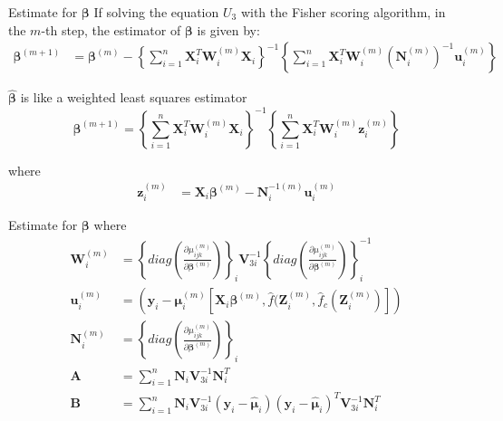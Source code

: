 \documentclass[t,9pt]{beamer}
\begin{document}
\begin{frame}[fragile]{Estimate for $\pmb{\beta}$}
If solving the equation $U_3$ with the Fisher scoring algorithm, in the  $m$-th step, the estimator of $\pmb{\beta}$ is given by:
\begin{align}
 \pmb{\beta}^{(m+1)}&=\pmb{\beta}^{(m)}- \left\{ \sum_{i=1}^n \pmb{X}_i^T \pmb{W}_i^{(m)} \pmb{X}_i \right\}^{-1} \left\{\sum_{i=1}^n\pmb{X}_i^T \pmb{W}_i^{(m)} \left(\pmb{N}_i^{(m)} \right)^{-1}  \pmb{u}_i^{(m)}  \right\} \nonumber
 \end{align}
\begin{block}{$\hat{\pmb{\beta}}$ is like a weighted least squares estimator}
   \begin{equation}\nonumber
    \pmb{\beta}^{(m+1)}=\left\{ \sum_{i=1}^n \pmb{X}_i^T \pmb{W}_i^{(m)} \pmb{X}_i \right\}^{-1} \left\{\sum_{i=1}^n\pmb{X}_i^T \pmb{W}_i^{(m)}  \pmb{z}_i^{(m)}  \right\} 
\end{equation}
\end{block}
where
 \begin{align*}
     \pmb{z}^{(m)}_i&=\pmb{X}_i\pmb{\beta}^{(m)}-\pmb{N}_i^{-1(m)}\pmb{u}_i^{(m)} 
\end{align*}
\end{frame}
\begin{frame}[fragile]{Estimate for $\pmb{\beta}$}
where
\begin{align*}
\pmb{W}_i^{(m)}&=\left\{  diag\left(\frac{\partial \mu_{ijk}^{(m)}}{\partial \pmb{\beta}^{(m)}}\right)\right\}_i\pmb{V}^{-1}_{3i} \left\{  diag\left(\frac{\partial \mu_{ijk}^{(m)}}{\partial \pmb{\beta}^{(m)}}\right)\right\}_i ^{-1} \\
\pmb{u}_i^{(m)}&=\left(\pmb{y}_i-\pmb{\mu}_i^{(m)}\left[\pmb{X}_i \pmb{\beta}^{(m)},\hat{f}(\pmb{Z}_{i}^{(m)} ,\hat{f}_c(\pmb{Z}_{i}^{(m)}) \right]\right)\\
\pmb{N}_i^{(m)}&=\left\{  diag\left(\frac{\partial \mu_{ijk}^{(m)}}{\partial \pmb{\beta}^{(m)}}\right)\right\}_i\\
 \pmb{A}&=\sum_{i=1}^n  \pmb{N}_i \pmb{V}^{-1}_{3i}\pmb{N}_i^T \\
   \pmb{B}&=\sum_{i=1}^n  \pmb{N}_i \pmb{V}^{-1}_{3i}\left(\pmb{y}_i-\pmb{\hat{\mu}}_i\right)\left(\pmb{y}_i-\pmb{\hat{\mu}}_i\right)^T \pmb{V}^{-1}_{3i} \pmb{N}_i^T
\end{align*}
\end{frame}
\end{document}
